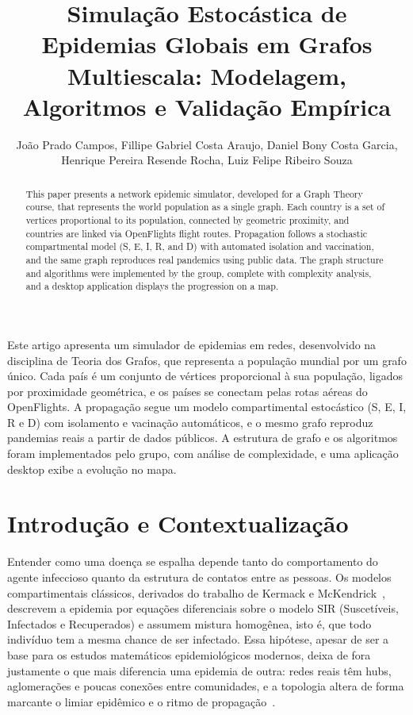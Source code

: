 \documentclass[11pt]{article}
\title{Simulação Estocástica de Epidemias Globais em Grafos Multiescala: Modelagem, Algoritmos e Validação Empírica}
\author{João Prado Campos\inst{1}, Fillipe Gabriel Costa Araujo\inst{1}, Daniel Bony Costa Garcia\inst{1},\\
Henrique Pereira Resende Rocha\inst{1}, Luiz Felipe Ribeiro Souza\inst{1}}
\begin{document}
 

\maketitle

\begin{abstract}
  This paper presents a network epidemic simulator, developed for a Graph Theory course, that represents the world population as a single graph. Each country is a set of vertices proportional to its population, connected by geometric proximity, and countries are linked via OpenFlights flight routes. Propagation follows a stochastic compartmental model (S, E, I, R, and D) with automated isolation and vaccination, and the same graph reproduces real pandemics using public data. The graph structure and algorithms were implemented by the group, complete with complexity analysis, and a desktop application displays the progression on a map.
\end{abstract}
     
\begin{resumo} 
  Este artigo apresenta um simulador de epidemias em redes, desenvolvido na disciplina de Teoria dos Grafos, que representa a população mundial por um grafo único. Cada país é um conjunto de vértices proporcional à sua população, ligados por proximidade geométrica, e os países se conectam pelas rotas aéreas do OpenFlights. A propagação segue um modelo compartimental estocástico (S, E, I, R e D) com isolamento e vacinação automáticos, e o mesmo grafo reproduz pandemias reais a partir de dados públicos. A estrutura de grafo e os algoritmos foram implementados pelo grupo, com análise de complexidade, e uma aplicação desktop exibe a evolução no mapa.
\end{resumo}


\section{Introdução e Contextualização}

Entender como uma doença se espalha depende tanto do comportamento do agente infeccioso quanto da estrutura de contatos entre as pessoas. Os modelos compartimentais clássicos, derivados do trabalho de Kermack e McKendrick~\cite{kermack1927}, descrevem a epidemia por equações diferenciais sobre o modelo SIR (Suscetíveis, Infectados e Recuperados) e assumem mistura homogênea, isto é, que todo indivíduo tem a mesma chance de ser infectado. Essa hipótese, apesar de ser a base para os estudos matemáticos epidemiológicos modernos, deixa de fora justamente o que mais diferencia uma epidemia de outra: redes reais têm hubs, aglomerações e poucas conexões entre comunidades, e a topologia altera de forma marcante o limiar epidêmico e o ritmo de propagação~\cite{pastor2015}.
\end{document}
